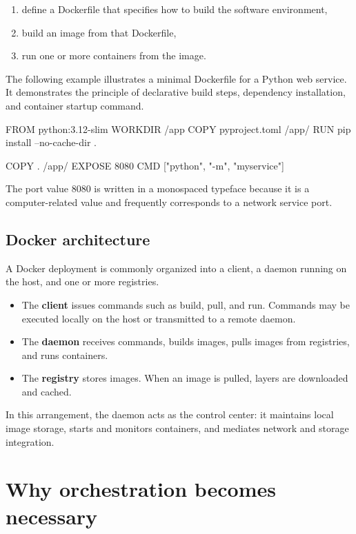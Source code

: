 \documentclass[11pt,a4paper,openany]{report}
\begin{document}
\begin{enumerate}
\item define a Dockerfile that specifies how to build the software environment,
\item build an image from that Dockerfile,
\item run one or more containers from the image.
\end{enumerate}

The following example illustrates a minimal Dockerfile for a Python web service. It demonstrates the principle of declarative build steps, dependency installation, and container startup command.

\begin{codeblock}
FROM python:3.12-slim
WORKDIR /app
COPY pyproject.toml /app/
RUN pip install --no-cache-dir .

COPY . /app/
EXPOSE 8080
CMD ["python", "-m", "myservice"]
\end{codeblock}

The port value 8080 is written in a monospaced typeface because it is a computer-related value and frequently corresponds to a network service port.

\subsection{Docker architecture}

A Docker deployment is commonly organized into a client, a daemon running on the host, and one or more registries.

\begin{itemize}
\item The \textbf{client} issues commands such as build, pull, and run. Commands may be executed locally on the host or transmitted to a remote daemon.
\item The \textbf{daemon} receives commands, builds images, pulls images from registries, and runs containers.
\item The \textbf{registry} stores images. When an image is pulled, layers are downloaded and cached.
\end{itemize}

In this arrangement, the daemon acts as the control center: it maintains local image storage, starts and monitors containers, and mediates network and storage integration.

\section{Why orchestration becomes necessary}
\end{document}
